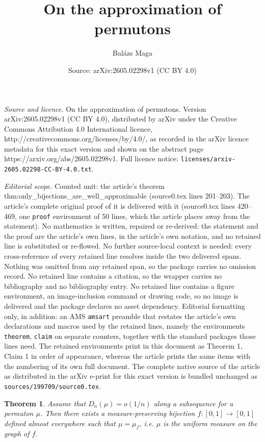 \documentclass[10pt,a4paper]{amsart}
\title{On the approximation of permutons}
\author{Bal\'azs Maga}
\date{Source: arXiv:2605.02298v1 (CC BY 4.0)}
\newtheorem{theorem}{Theorem}
\begin{document}
\maketitle

\noindent\emph{Source and licence.} On the approximation of permutons. Version arXiv:2605.02298v1 (CC BY 4.0), distributed by arXiv under the Creative Commons Attribution 4.0 International licence, http://creativecommons.org/licenses/by/4.0/, as recorded in the arXiv licence metadata for this exact version and shown on the abstract page https://arxiv.org/abs/2605.02298v1. Full licence notice: \texttt{licenses/arxiv-2605.02298-CC-BY-4.0.txt}.\par\smallskip

\noindent\textit{Editorial scope.} Counted unit: the article's theorem thm:only\_bijections\_are\_well\_approximable (source0.tex lines 201--203). The article's complete original proof of it is delivered with it (source0.tex lines 420--469, one \texttt{proof} environment of 50 lines, which the article places away from the statement). No mathematics is written, repaired or re-derived: the statement and the proof are the article's own lines, in the article's own notation, and no retained line is substituted or re-flowed.  No further source-local context is needed: every cross-reference of every retained line resolves inside the two delivered spans.  Nothing was omitted from any retained span, so the package carries no omission record.  No retained line contains a citation, so the wrapper carries no bibliography and no bibliography entry.  No retained line contains a figure environment, an image-inclusion command or drawing code, so no image is delivered and the package declares no asset dependency.  Editorial formatting only, in addition: an AMS \texttt{amsart} preamble that restates the article's own declarations and macros used by the retained lines, namely the environments \texttt{theorem}, \texttt{claim} on separate counters, together with the standard packages those lines need.  The retained environments print in this document as Theorem 1, Claim 1 in order of appearance, whereas the article prints the same items with the numbering of its own full document.  The complete native source of the article as distributed in the arXiv e-print for this exact version is bundled unchanged as \texttt{sources/199709/source0.tex}.
\begin{theorem}\label{thm:only_bijections_are_well_approximable}
    Assume that $D_n(\mu)=o(1/n)$ along a subsequence for a permuton $\mu$. Then there exists a measure-preserving bijection $f:[0,1]\to[0, 1]$ defined almost everywhere such that $\mu=\mu_f$, i.e. $\mu$ is the uniform measure on the graph of $f$.
\end{theorem}
\end{document}
